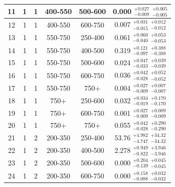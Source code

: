 \begin{table}[htbp]
\begin{centering}
\begin{tabular}{|c|c|c|c|c||c|}
 \hline
             11 &               1 &               1 &         400-550 &         500-600 & 0.000 $^{+0.027}_{-0.009}$  $^{+0.005}_{-0.005}$  \\
 \hline
             12 &               1 &               1 &         400-550 &         600-750 & 0.007 $^{+0.031}_{-0.015}$  $^{+0.012}_{-0.012}$  \\
 \hline
             13 &               1 &               1 &         550-750 &         250-400 & 0.061 $^{+0.060}_{-0.040}$  $^{+0.053}_{-0.053}$  \\
 \hline
             14 &               1 &               1 &         550-750 &         400-500 & 0.319 $^{+0.121}_{-0.097}$  $^{+0.388}_{-0.388}$  \\
 \hline
             15 &               1 &               1 &         550-750 &         500-600 & 0.024 $^{+0.047}_{-0.033}$  $^{+0.039}_{-0.039}$  \\
 \hline
             16 &               1 &               1 &         550-750 &         600-750 & 0.036 $^{+0.042}_{-0.028}$  $^{+0.052}_{-0.052}$  \\
 \hline
             17 &               1 &               1 &         550-750 &            750+ & 0.004 $^{+0.027}_{-0.009}$  $^{+0.007}_{-0.007}$  \\
 \hline
             18 &               1 &               1 &            750+ &         250-600 & 0.032 $^{+0.034}_{-0.019}$  $^{+0.170}_{-0.170}$  \\
 \hline
             19 &               1 &               1 &            750+ &         600-750 & 0.001 $^{+0.027}_{-0.009}$  $^{+0.009}_{-0.009}$  \\
 \hline
             20 &               1 &               1 &            750+ &            750+ & 0.055 $^{+0.042}_{-0.028}$  $^{+0.290}_{-0.290}$  \\
 \hline
             21 &               1 &               2 &         200-350 &         250-400 & 53.76 $^{+4.982}_{-4.747}$  $^{+34.32}_{-34.32}$  \\
 \hline
             22 &               1 &               2 &         200-350 &         400-500 & 2.278 $^{+0.949}_{-0.822}$  $^{+3.946}_{-3.946}$  \\
 \hline
             23 &               1 &               2 &         200-350 &         500-600 & 0.000 $^{+0.204}_{-0.139}$  $^{+0.045}_{-0.045}$  \\
 \hline
             24 &               1 &               2 &         200-350 &         600-750 & 0.000 $^{+0.158}_{-0.088}$  $^{+0.032}_{-0.032}$  \\

\end{tabular}
\end{centering}
\end{table}
